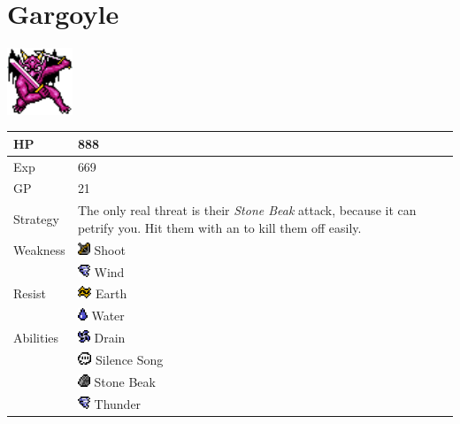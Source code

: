 \section{Gargoyle}
\label{monster:gargoyle}

\includegraphics[height=2cm,keepaspectratio]{./resources/monster/gargoyle}

\begin{longtable}{ l p{9cm} }
	HP
	& 888
\\ \hline
	Exp
	& 669
\\ \hline
	GP
	& 21
\\ \hline
	Strategy
	& The only real threat is their \textit{Stone Beak} attack, because it can petrify you. Hit them with an \nameref{spell:aero} to kill them off easily.
\\ \hline
	Weakness
	& \includegraphics[height=1em,keepaspectratio]{./resources/effects/shoot} Shoot \\
	& \includegraphics[height=1em,keepaspectratio]{./resources/effects/wind} Wind
\\ \hline
	Resist
	& \includegraphics[height=1em,keepaspectratio]{./resources/effects/earth} Earth \\
	& \includegraphics[height=1em,keepaspectratio]{./resources/effects/water} Water
\\ \hline
	Abilities
	& \includegraphics[height=1em,keepaspectratio]{./resources/effects/drain} Drain \\
	& \includegraphics[height=1em,keepaspectratio]{./resources/effects/silence} Silence Song \\
	& \includegraphics[height=1em,keepaspectratio]{./resources/effects/petrify} Stone Beak \\
	& \includegraphics[height=1em,keepaspectratio]{./resources/effects/wind} Thunder
\end{longtable}
